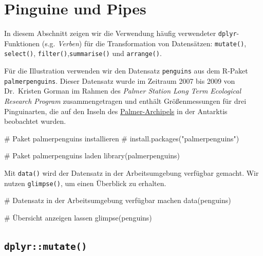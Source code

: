 \documentclass[
  a4paper,
  DIV=11,
  oneside]{scrreprt}
\newenvironment{Shaded}{\begin{snugshade}}{\end{snugshade}}
\newcommand{\CommentTok}[1]{\textcolor[rgb]{0.37,0.37,0.37}{#1}}
\newcommand{\FunctionTok}[1]{\textcolor[rgb]{0.28,0.35,0.67}{#1}}
\newcommand{\NormalTok}[1]{\textcolor[rgb]{0.00,0.23,0.31}{#1}}
\begin{document}
\hypertarget{pinguine-und-pipes}{%
\section{Pinguine und Pipes}\label{pinguine-und-pipes}}

In diesem Abschnitt zeigen wir die Verwendung häufig verwendeter
\texttt{dplyr}-Funktionen (s.g. \emph{Verben}) für die Transformation
von Datensätzen: \texttt{mutate()}, \texttt{select()},
\texttt{filter()},\texttt{summarise()} und \texttt{arrange()}.

Für die Illustration verwenden wir den Datensatz \texttt{penguins} aus
dem R-Paket \texttt{palmerpenguins}. Dieser Datensatz wurde im Zeitraum
2007 bis 2009 von Dr.~Kristen Gorman im Rahmen des \emph{Palmer Station
Long Term Ecological Research Program} zusammengetragen und enthält
Größenmessungen für drei Pinguinarten, die auf den Inseln des
\href{https://en.wikipedia.org/wiki/Palmer_Archipelago}{Palmer-Archipels}
in der Antarktis beobachtet wurden.

\begin{Shaded}
\begin{Highlighting}[]
\CommentTok{\# Paket \textquotesingle{}palmerpenguins\textquotesingle{} installieren}
\CommentTok{\# install.packages("palmerpenguins")}

\CommentTok{\# Paket \textquotesingle{}palmerpenguins\textquotesingle{} laden}
\FunctionTok{library}\NormalTok{(palmerpenguins)}
\end{Highlighting}
\end{Shaded}

Mit \texttt{data()} wird der Datensatz in der Arbeitsumgebung verfügbar
gemacht. Wir nutzen \texttt{glimpse()}, um einen Überblick zu erhalten.

\begin{Shaded}
\begin{Highlighting}[]
\NormalTok{\# Datensatz in der Arbeitsumgebung verfügbar machen}
\NormalTok{data(penguins)}

\NormalTok{\# Übersicht anzeigen lassen}
\NormalTok{glimpse(penguins)}
\end{Highlighting}
\end{Shaded}

\hypertarget{dplyrmutate}{%
\subsection{\texorpdfstring{\texttt{dplyr::mutate()}}{dplyr::mutate()}}\label{dplyrmutate}}
\end{document}
